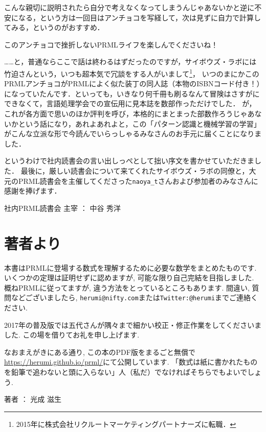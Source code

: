 こんな親切に説明されたら自分で考えなくなってしまうんじゃあないかと逆に不安になる，という方は一回目はアンチョコを写経して，次は見ずに自力で計算してみる，というのがおすすめ．

このアンチョコで挫折しないPRMLライフを楽しんでくださいね！

……と，普通ならここで話は終わるはずだったのですが，サイボウズ・ラボには竹迫さんという，いつも超本気で冗談をする人がいまして\footnote{2015年に株式会社リクルートマーケティングパートナーズに転職．}，
いつのまにかこのPRMLアンチョコがPRMLによく似た装丁の同人誌（本物のISBNコード付き！）になっていたんです．といっても，いきなり何千冊も刷るなんて冒険はさすがにできなくて，言語処理学会での宣伝用に見本誌を数部作っただけでした．
が，これが各方面で思いのほか評判を呼び，本格的にまとまった部数作ろうじゃあないかという話になり，あれよあれよと，この「パターン認識と機械学習の学習」がこんな立派な形で今読んでいらっしゃるみなさんのお手元に届くことになりました．

というわけで社内読書会の言い出しっぺとして拙い序文を書かせていただきました．
最後に，厳しい読書会について来てくれたサイボウズ・ラボの同僚と，大元のPRML読書会を主催してくださった{\tt naoya\_t}さんおよび参加者のみなさんに感謝を捧げます．

\begin{flushright}

社内PRML読書会 主宰 ： 中谷 秀洋
\end{flushright}

\vspace{\baselineskip}
\section*{著者より}
本書はPRMLに登場する数式を理解するために必要な数学をまとめたものです.
いくつかの定理は証明せずに認めますが, 可能な限り自己完結を目指しました.
概ねPRMLに従ってますが, 違う方法をとっているところもあります.
間違い, 質問などございましたら, {\tt herumi@nifty.com}または{\tt Twitter:@herumi}までご連絡ください.

2017年の普及版では五代さんが隅々まで細かい校正・修正作業をしてくださいました. この場を借りてお礼を申し上げます.

なおまえがきにある通り, この本のPDF版をまるごと無償で\url{https://herumi.github.io/prml/}にて公開しています.
「数式は紙に書かれたものを鉛筆で追わないと頭に入らない」人（私だ）でなければそちらでもよいでしょう.
\begin{flushright}

著者 ： 光成 滋生
\end{flushright}
